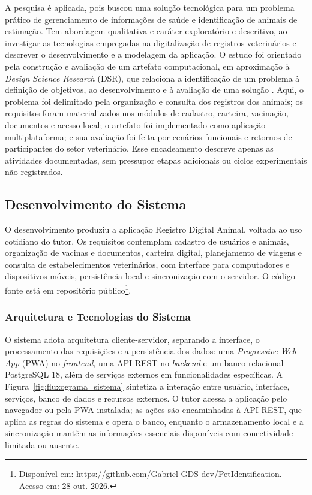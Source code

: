 \documentclass{UNESC}
\begin{document}
A pesquisa é aplicada, pois buscou uma solução tecnológica para um problema prático de gerenciamento de informações de saúde e identificação de animais de estimação. Tem abordagem qualitativa e caráter exploratório e descritivo, ao investigar as tecnologias empregadas na digitalização de registros veterinários e descrever o desenvolvimento e a modelagem da aplicação. O estudo foi orientado pela construção e avaliação de um artefato computacional, em aproximação à \textit{Design Science Research} (DSR), que relaciona a identificação de um problema à definição de objetivos, ao desenvolvimento e à avaliação de uma solução \cite{peffers2007}. Aqui, o problema foi delimitado pela organização e consulta dos registros dos animais; os requisitos foram materializados nos módulos de cadastro, carteira, vacinação, documentos e acesso local; o artefato foi implementado como aplicação multiplataforma; e sua avaliação foi feita por cenários funcionais e retornos de participantes do setor veterinário. Esse encadeamento descreve apenas as atividades documentadas, sem pressupor etapas adicionais ou ciclos experimentais não registrados.

\subsection{Desenvolvimento do Sistema}

O desenvolvimento produziu a aplicação Registro Digital Animal, voltada ao uso cotidiano do tutor. Os requisitos contemplam cadastro de usuários e animais, organização de vacinas e documentos, carteira digital, planejamento de viagens e consulta de estabelecimentos veterinários, com interface para computadores e dispositivos móveis, persistência local e sincronização com o servidor. O código-fonte está em repositório público\footnote{Disponível em: \url{https://github.com/Gabriel-GDS-dev/PetIdentification}. Acesso em: 28 out. 2026.}.

\subsubsection{Arquitetura e Tecnologias do Sistema}

O sistema adota arquitetura cliente-servidor, separando a interface, o processamento das requisições e a persistência dos dados: uma \textit{Progressive Web App} (PWA) no \textit{frontend}, uma API REST no \textit{backend} e um banco relacional PostgreSQL 18, além de serviços externos em funcionalidades específicas. A Figura~\ref{fig:fluxograma_sistema} sintetiza a interação entre usuário, interface, serviços, banco de dados e recursos externos. O tutor acessa a aplicação pelo navegador ou pela PWA instalada; as ações são encaminhadas à API REST, que aplica as regras do sistema e opera o banco, enquanto o armazenamento local e a sincronização mantêm as informações essenciais disponíveis com conectividade limitada ou ausente.
\end{document}
